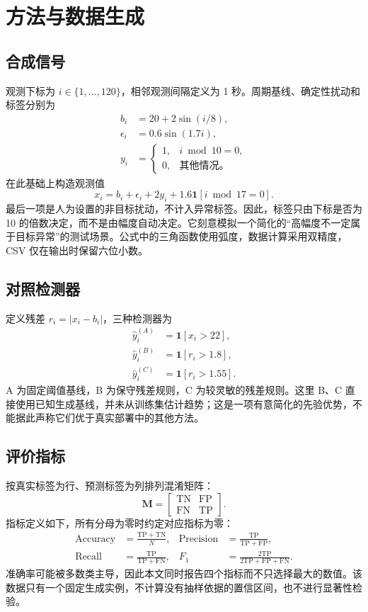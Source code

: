 \section{方法与数据生成}
\label{sec:method}
\subsection{合成信号}
观测下标为 $i\in\{1,\ldots,120\}$，相邻观测间隔定义为 1 秒。周期基线、确定性扰动和标签分别为
\begin{align}
b_i &= 20+2\sin(i/8), \label{eq:baseline}\\
\epsilon_i &= 0.6\sin(1.7i),\\
y_i &= \begin{cases}1,& i\bmod 10=0,\\0,&\text{其他情况。}\end{cases}
\end{align}
在此基础上构造观测值
\begin{equation}
x_i=b_i+\epsilon_i+2y_i+1.6\mathbf{1}[i\bmod17=0].
\label{eq:signal}
\end{equation}
最后一项是人为设置的非目标扰动，不计入异常标签。因此，标签只由下标是否为 10 的倍数决定，而不是由幅度自动决定。它刻意模拟一个简化的“高幅度不一定属于目标异常”的测试场景。公式中的三角函数使用弧度，数据计算采用双精度，CSV 仅在输出时保留六位小数。

\subsection{对照检测器}
定义残差 $r_i=|x_i-b_i|$，三种检测器为
\begin{align}
\hat y_i^{(A)}&=\mathbf{1}[x_i>22],\\
\hat y_i^{(B)}&=\mathbf{1}[r_i>1.8],\\
\hat y_i^{(C)}&=\mathbf{1}[r_i>1.55].
\end{align}
A 为固定阈值基线，B 为保守残差规则，C 为较灵敏的残差规则。这里 B、C 直接使用已知生成基线，并未从训练集估计趋势；这是一项有意简化的先验优势，不能据此声称它们优于真实部署中的其他方法。

\subsection{评价指标}
按真实标签为行、预测标签为列排列混淆矩阵：
\begin{equation}
\mathbf{M}=\begin{bmatrix}\mathrm{TN}&\mathrm{FP}\\\mathrm{FN}&\mathrm{TP}\end{bmatrix}.
\end{equation}
指标定义如下，所有分母为零时约定对应指标为零\cite{lolMetrics2026}：
\begin{align}
\mathrm{Accuracy}&=\frac{\mathrm{TP}+\mathrm{TN}}{N},&
\mathrm{Precision}&=\frac{\mathrm{TP}}{\mathrm{TP}+\mathrm{FP}},\\
\mathrm{Recall}&=\frac{\mathrm{TP}}{\mathrm{TP}+\mathrm{FN}},&
F_1&=\frac{2\mathrm{TP}}{2\mathrm{TP}+\mathrm{FP}+\mathrm{FN}}.
\label{eq:f1}
\end{align}
准确率可能被多数类主导，因此本文同时报告四个指标而不只选择最大的数值。该数据只有一个固定生成实例，不计算没有抽样依据的置信区间，也不进行显著性检验。
